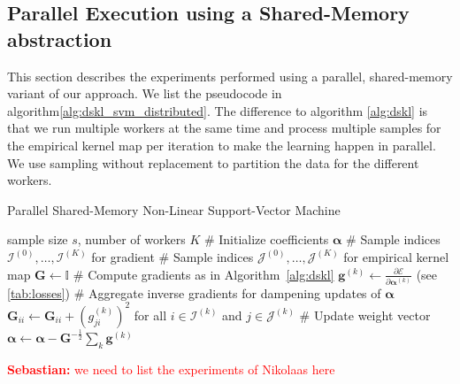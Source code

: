 \documentclass{article} %
\newcommand{\va}{\boldsymbol{\alpha}}
\renewcommand{\vec}[1]{\mathbf{#1}}
\newcommand{\sebastian}[1]{\textcolor{red}{{\bf Sebastian:} #1}}
\begin{document}
 \subsection{Parallel Execution using a Shared-Memory abstraction}\label{sec:distributed}
This section describes the experiments performed using a parallel, shared-memory variant of our approach. We list the pseudocode in algorithm\autoref{alg:dskl_svm_distributed}. The difference to algorithm \autoref{alg:dskl} is that we run multiple workers at the same time and process multiple samples for the empirical kernel map per iteration to make the learning happen in parallel. We use sampling without replacement to partition the data for the different workers. 

 \begin{algorithm}
   \begin{algorithmic}[1]
     \caption{Parallel Shared-Memory Non-Linear Support-Vector Machine\label{alg:dskl_svm_distributed}}
       \REQUIRE sample size $s$, number of workers $K$
       \STATE \# Initialize coefficients $\va$
       \STATE \# Sample indices $\mathcal{I}^{(0)},\dots,\mathcal{I}^{(K)}$ for gradient 
       \STATE \# Sample indices $\mathcal{J}^{(0)},\dots,\mathcal{J}^{(K)}$ for empirical kernel map 
       \STATE $\vec{G} \leftarrow \mathbb{I}$
             \STATE \# Compute gradients as in Algorithm~\autoref{alg:dskl}
             \STATE $\vec{g}^{(k)} \gets \frac{\partial \mathcal{E}}{\partial\va^{(k)}}$ (see \autoref{tab:losses})
             \STATE \# Aggregate inverse gradients for dampening updates of $\va$
             \STATE $\vec{G}_{ii} \leftarrow \vec{G}_{ii} + \left(g^{(k)}_{ji}\right)^2$ for all $i \in\mathcal{I}^{(k)}$ and $j\in\mathcal{J}^{(k)}$
           \ENDFOR
         \ENDFOR
         \STATE \# Update weight vector 
         \STATE $\va \leftarrow \va - \vec{G}^{-\frac{1}{2}} \sum_k \vec{g}^{(k)}$
       \ENDWHILE
   \end{algorithmic}
 \end{algorithm}

\sebastian{we need to list the experiments of Nikolaas here}


\end{document}
